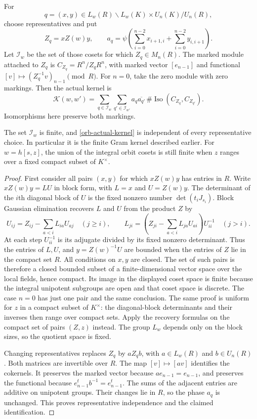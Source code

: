 For
\[
 q=(x,y)\in L_w(R)\backslash L_w(K)
                    \times U_n(K)/U_n(R),
\]
choose representatives and put
\[
 Z_q=xZ(w)y,\qquad
 a_q=\psi\left(\sum_{i=0}^{n-2}x_{i+1,i}
                       +\sum_{i=0}^{n-2}y_{i,i+1}\right).
\]
Let $\mathcal I_w$ be the set of those cosets for which
$Z_q\in M_n(R)$.  The marked module attached to $Z_q$ is
$C_{Z_q}=R^n/Z_qR^n$, with marked vector $[e_{n-1}]$ and
functional $[v]\mapsto (Z_q^{-1}v)_{n-1}\pmod R$.
For $n=0$, take the zero module with zero markings.  Then the actual kernel is
\begin{equation}\label{orb-actual-kernel}
 \mathcal K(w,w')=
 \sum_{q\in\mathcal I_w}\sum_{q'\in\mathcal I_{w'}}
 a_q\overline{a_{q'}}\,
       \#\operatorname{Iso}(C_{Z_q},C_{Z_{q'}}).
\end{equation}
Isomorphisms here preserve both markings.

\begin{lemma}\label{orb-finite-orbits}
The set $\mathcal I_w$ is finite, and
\eqref{orb-actual-kernel} is independent of every representative
choice.  In particular it is the finite Gram kernel described
earlier.  For $w=h[s,z]$, the union of the integral orbit cosets
is still finite when $z$ ranges over a fixed compact subset of
$K^\times$.
\end{lemma}

\begin{proof}
First consider all pairs $(x,y)$ for which $xZ(w)y$ has entries
in $R$.  Write $xZ(w)y=LU$ in block form, with $L=x$ and
$U=Z(w)y$.  The determinant of the $i$th diagonal block of $U$
is the fixed nonzero number $\det(t_iJ_{s_i})$.
Block Gaussian elimination recovers $L$ and $U$ from the product
$Z$ by
\[
 U_{ij}=Z_{ij}-\sum_{a<i}L_{ia}U_{aj}\quad(j\ge i),\qquad
 L_{ji}=\left(Z_{ji}-\sum_{a<i}L_{ja}U_{ai}\right)U_{ii}^{-1}
 \quad(j>i).
\]
At each step $U_{ii}^{-1}$ is its adjugate divided by its fixed
nonzero determinant.  Thus the entries of $L,U$, and
$y=Z(w)^{-1}U$ are bounded when the entries of $Z$ lie in the
compact set $R$.  All conditions on $x,y$ are closed.  The set
of such pairs is therefore a closed bounded subset of a
finite-dimensional vector space over the local fields, hence
compact.  Its image in the displayed coset space is finite because
the integral unipotent subgroups are open and that coset space
is discrete.  The case $n=0$ has just one pair and the same
conclusion.
The same proof is uniform for $z$ in a compact subset of
$K^\times$: the diagonal-block determinants and their inverses
then range over compact sets.  Apply the recovery formulas on
the compact set of pairs $(Z,z)$ instead.  The group $L_w$
depends only on the block sizes, so the quotient space is fixed.

Changing representatives replaces $Z_q$ by $aZ_qb$, with
$a\in L_w(R)$ and $b\in U_n(R)$.  Both matrices are invertible
over $R$.  The map $[v]\mapsto[av]$ identifies the cokernels.
It preserves the marked vector because $ae_{n-1}=e_{n-1}$,
and preserves the functional because
$e_{n-1}^tb^{-1}=e_{n-1}^t$.
The sums of the adjacent entries are additive on unipotent
groups.  Their changes lie in $R$, so the phase $a_q$ is
unchanged.  This proves representative independence and the
claimed identification.
\end{proof}

